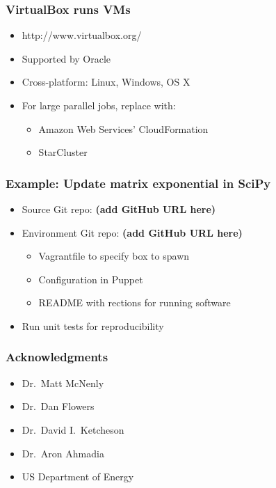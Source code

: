 \documentclass [14pt]{beamer}
\begin{document}
\begin{frame}
\frametitle{VirtualBox runs VMs}
\begin{itemize}
\item http://www.virtualbox.org/
\item Supported by Oracle
\item Cross-platform: Linux, Windows, OS X
\item For large parallel jobs, replace with:
\begin{itemize}
\item Amazon Web Services' CloudFormation
\item StarCluster
\end{itemize}
\end{itemize}
\end{frame}

\begin{frame}
\frametitle{Example: Update matrix exponential in SciPy}
\begin{itemize}
\item Source Git repo: \textbf{(add GitHub URL here)}
\item Environment Git repo: \textbf{(add GitHub URL here)}
\begin{itemize}
\item Vagrantfile to specify box to spawn
\item Configuration in Puppet
\item README with rections for running software
\end{itemize}
\item Run unit tests for reproducibility
\end{itemize}
\end{frame}

\begin{frame}
\frametitle{Acknowledgments}
\begin{itemize}
\item Dr.\ Matt McNenly
\item Dr.\ Dan Flowers
\item Dr.\ David I.\ Ketcheson
\item Dr.\ Aron Ahmadia
\item US Department of Energy
\end{itemize}
\end{frame}

\begin{frame}
\end{frame}
\end{document}
